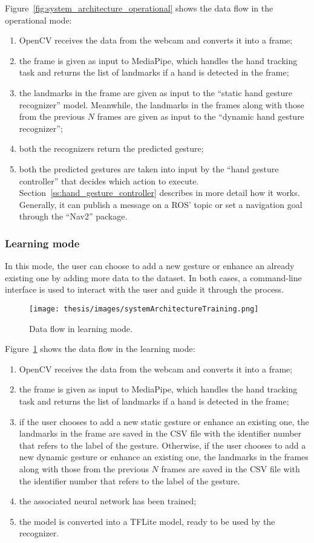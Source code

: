 \documentclass[../thesis.tex]{subfiles}
\begin{document}
Figure~\ref{fig:system_architecture_operational} shows the data flow in the operational mode:
\begin{enumerate}
    \item OpenCV receives the data from the webcam and converts it into a frame;
    \item the frame is given as input to MediaPipe, which handles the hand tracking task and returns the list of landmarks if a hand is detected in the frame;
    \item the landmarks in the frame are given as input to the ``static hand gesture recognizer'' model. Meanwhile, the landmarks in the frames along with those from the previous $N$ frames are given as input to the ``dynamic hand gesture recognizer'';
    \item both the recognizers return the predicted gesture;
    \item both the predicted gestures are taken into input by the ``hand gesture controller'' that decides which action to execute. Section~\ref{ss:hand_gesture_controller} describes in more detail how it works. Generally, it can publish a message on a \acrshort{ROS}' topic or set a navigation goal through the ``Nav2'' package.
\end{enumerate}

\subsubsection{Learning mode}
In this mode, the user can choose to add a new gesture or enhance an already existing one by adding more data to the dataset. In both cases, a command-line interface is used to interact with the user and guide it through the process.
\begin{figure}[H]
    \centering
    \texttt{[image: thesis/images/systemArchitectureTraining.png]}
    \caption{Data flow in learning mode.}
    \label{fig:system_architecture_learning}
\end{figure}
Figure~\ref{fig:system_architecture_learning} shows the data flow in the learning mode:
\begin{enumerate}
    \item OpenCV receives the data from the webcam and converts it into a frame;
    \item the frame is given as input to MediaPipe, which handles the hand tracking task and returns the list of landmarks if a hand is detected in the frame;
    \item if the user chooses to add a new static gesture or enhance an existing one, the landmarks in the frame are saved in the CSV file with the identifier number that refers to the label of the gesture. Otherwise, if the user chooses to add a new dynamic gesture or enhance an existing one, the landmarks in the frames along with those from the previous $N$ frames are saved in the CSV file with the identifier number that refers to the label of the gesture.
    \item the associated neural network has been trained;
    \item the model is converted into a TFLite model, ready to be used by the recognizer.
\end{enumerate}
\end{document}
